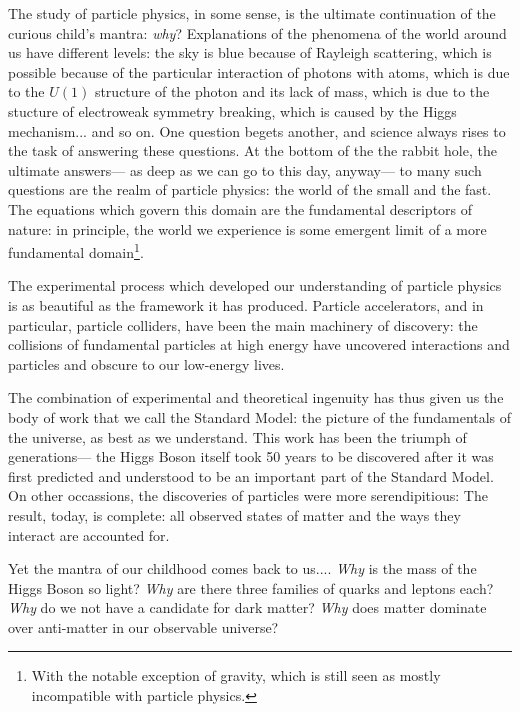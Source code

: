 \label{chapter:introduction}

The study of particle physics, in some sense, is the ultimate continuation of the curious child's mantra: \textit{why}? Explanations of the phenomena of the world around us have different levels: the sky is blue because of Rayleigh scattering, which is possible because of the particular interaction of photons with atoms, which is due to the $U(1)$ structure of the photon and its lack of mass, which is due to the stucture of electroweak symmetry breaking, which is caused by the Higgs mechanism... and so on. One question begets another, and science always rises to the task of answering these questions. At the bottom of the the rabbit hole, the ultimate answers--- as deep as we can go to this day, anyway--- to many such questions are the realm of particle physics: the world of the small and the fast. The equations which govern this domain are the fundamental descriptors of nature: in principle, the world we experience is some emergent limit of a more fundamental domain\footnote{With the notable exception of gravity, which is still seen as mostly incompatible with particle physics.}.

The experimental process which developed our understanding of particle physics is as beautiful as the framework it has produced. Particle accelerators, and in particular, particle colliders, have been the main machinery of discovery: the collisions of fundamental particles at high energy have uncovered interactions and particles and obscure to our low-energy lives. 

The combination of experimental and theoretical ingenuity has thus given us the body of work that we call the Standard Model: the picture of the fundamentals of the universe, as best as we understand. This work has been the triumph of generations--- the Higgs Boson itself took 50 years to be discovered after it was first predicted and understood to be an important part of the Standard Model. On other occassions, the discoveries of particles were more serendipitious:  The result, today, is complete: all observed states of matter and the ways they interact are accounted for.

Yet the mantra of our childhood comes back to us.... \textit{Why} is the mass of the Higgs Boson so light? \textit{Why} are there three families of quarks and leptons each? \textit{Why} do we not have a candidate for dark matter? \textit{Why} does matter dominate over anti-matter in our observable universe?

